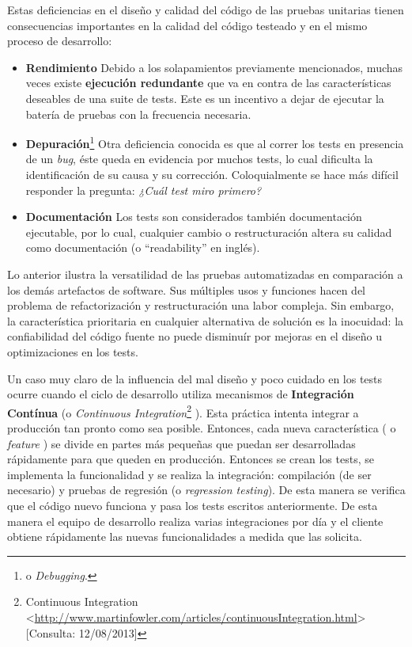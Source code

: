 \par Estas deficiencias en el diseño y calidad del código de las pruebas unitarias tienen consecuencias importantes en la calidad del código testeado y en el mismo proceso de desarrollo:

\begin{itemize}
\item \textbf{Rendimiento} Debido a los solapamientos previamente mencionados, muchas veces existe \textbf{ejecución redundante} que va en contra de las características deseables de una suite de tests. Este es un incentivo a dejar de ejecutar la batería de pruebas con la frecuencia necesaria.

\item \textbf{Depuración}\footnote{o \emph{Debugging}.} Otra deficiencia conocida es que al correr los tests en presencia de un \emph{bug}, éste queda en evidencia por muchos tests, lo cual dificulta la identificación de su causa y su corrección. Coloquialmente se hace más difícil responder la pregunta: \emph{¿Cuál test miro primero?}

\item \textbf{Documentación} Los tests son considerados también documentación ejecutable, por lo cual, cualquier cambio o restructuración altera su calidad como documentación (o ``readability'' en inglés).

\end{itemize}
 
\par Lo anterior ilustra la versatilidad de las pruebas automatizadas en comparación a los demás artefactos de software. Sus múltiples usos y funciones hacen del problema de refactorización y restructuración una labor compleja. Sin embargo, la característica prioritaria en cualquier alternativa de solución es la inocuidad: la confiabilidad del código fuente no puede disminuír por mejoras en el diseño u optimizaciones en los tests.


\par Un caso muy claro de la influencia del mal diseño y poco cuidado en los tests ocurre cuando el ciclo de desarrollo utiliza mecanismos de \textbf{Integración Contínua} (o \emph{Continuous Integration}\footnote{ Continuous Integration \textless\url{http://www.martinfowler.com/articles/continuousIntegration.html}\textgreater [Consulta: 12/08/2013] } ). Esta práctica intenta integrar a producción tan pronto como sea posible. Entonces, cada nueva característica ( o \emph{feature} ) se divide en partes más pequeñas que puedan ser desarrolladas rápidamente para que queden en producción. Entonces se crean los tests, se implementa la funcionalidad y se realiza la integración: compilación (de ser necesario) y pruebas de regresión (o \emph{regression testing}). De esta manera se verifica que el código nuevo funciona y pasa los tests escritos anteriormente. De esta manera el equipo de desarrollo realiza varias integraciones por día y el cliente obtiene rápidamente las nuevas funcionalidades a medida que las solicita. \\

